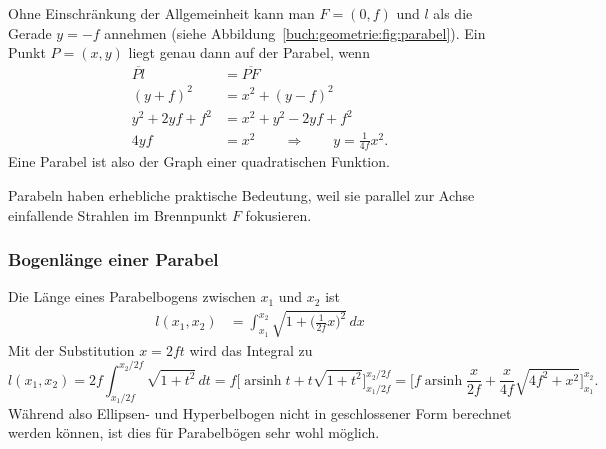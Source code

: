 Ohne Einschränkung der Allgemeinheit kann man $F=(0,f)$ und
$l$ als die Gerade $y=-f$ annehmen
(siehe Abbildung~\ref{buch:geometrie:fig:parabel}).
Ein Punkt $P=(x,y)$ liegt genau dann auf der Parabel, wenn
\begin{align*}
\overline{Pl}
&=
\overline{PF}
\\
(y+f)^2
&=
x^2 + (y-f)^2
\\
y^2+2yf+f^2
&=
x^2 + y^2-2yf+f^2
\\
4yf
&=
x^2
\qquad\Rightarrow\qquad y=\frac{1}{4f}x^2.
\end{align*}
Eine Parabel ist also der Graph einer quadratischen Funktion.

Parabeln haben erhebliche praktische Bedeutung, weil sie parallel zur
Achse einfallende Strahlen im Brennpunkt $F$ fokusieren.

\subsubsection{Bogenlänge einer Parabel}
Die Länge eines Parabelbogens zwischen $x_1$ und $x_2$ ist
\begin{align*}
l(x_1,x_2)
&=
\int_{x_1}^{x_2}
\sqrt{1+\biggl(\frac{1}{2f}x\biggr)^2}
\,dx
\end{align*}
Mit der Substitution $x=2ft$ wird das Integral zu
\[
l(x_1,x_2)
=
2f
\int_{x_1/2f}^{x_2/2f}
\sqrt{1+t^2}
\,dt
=
f\biggl[
\operatorname{arsinh} t +t\sqrt{1+t^2}
\biggr]_{x_1/2f}^{x_2/2f}
=
\biggl[
f
\operatorname{arsinh}\frac{x}{2f}
+
\frac{x}{4f}\sqrt{4f^2+x^2}
\biggr]_{x_1}^{x_2}.
\]
Während also Ellipsen- und Hyperbelbogen nicht in geschlossener
Form berechnet werden können, ist dies für Parabelbögen sehr wohl
möglich.





